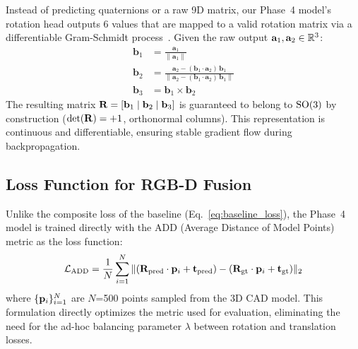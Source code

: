 Instead of predicting quaternions or a raw 9D matrix, our Phase~4 model's rotation head outputs 6 values that are mapped to a valid rotation matrix via a differentiable Gram-Schmidt process~\cite{zhou2019continuity}. Given the raw output $\mathbf{a}_1, \mathbf{a}_2 \in \mathbb{R}^3$:
\begin{align}
    \mathbf{b}_1 &= \frac{\mathbf{a}_1}{\|\mathbf{a}_1\|} \label{eq:gs1} \\[3pt]
    \mathbf{b}_2 &= \frac{\mathbf{a}_2 - (\mathbf{b}_1 \cdot \mathbf{a}_2)\,\mathbf{b}_1}{\|\mathbf{a}_2 - (\mathbf{b}_1 \cdot \mathbf{a}_2)\,\mathbf{b}_1\|} \label{eq:gs2} \\[3pt]
    \mathbf{b}_3 &= \mathbf{b}_1 \times \mathbf{b}_2 \label{eq:gs3}
\end{align}
The resulting matrix $\mathbf{R} = [\mathbf{b}_1 \mid \mathbf{b}_2 \mid \mathbf{b}_3]$ is guaranteed to belong to $\mathrm{SO}(3)$ by construction ($\det(\mathbf{R}) = +1$, orthonormal columns). This representation is continuous and differentiable, ensuring stable gradient flow during backpropagation.

\subsection{Loss Function for RGB-D Fusion}
\label{sec:method_add_loss}

Unlike the composite loss of the baseline (Eq.~\ref{eq:baseline_loss}), the Phase~4 model is trained directly with the ADD (Average Distance of Model Points) metric as the loss function:
\begin{equation}
    \mathcal{L}_{\text{ADD}} = \frac{1}{N} \sum_{i=1}^{N} \|(\mathbf{R}_{\text{pred}} \cdot \mathbf{p}_i + \mathbf{t}_{\text{pred}}) - (\mathbf{R}_{\text{gt}} \cdot \mathbf{p}_i + \mathbf{t}_{\text{gt}})\|_2
    \label{eq:add_loss}
\end{equation}
where $\{\mathbf{p}_i\}_{i=1}^N$ are $N$=500 points sampled from the 3D CAD model. This formulation directly optimizes the metric used for evaluation, eliminating the need for the ad-hoc balancing parameter $\lambda$ between rotation and translation losses.
